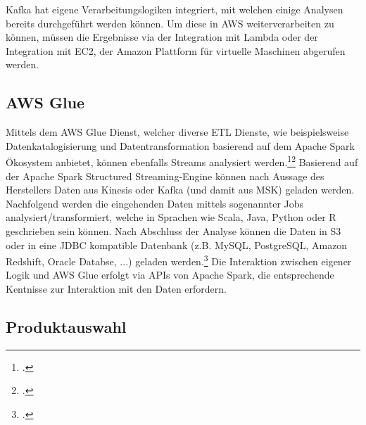 Kafka hat eigene Verarbeitungslogiken integriert, mit welchen einige Analysen bereits durchgeführt werden können. Um diese in \ac{AWS} weiterverarbeiten zu können, müssen die Ergebnisse via der Integration mit Lambda oder der Integration mit \ac{EC2}, der Amazon Plattform für virtuelle Maschinen abgerufen werden.


\subsection{AWS Glue}
Mittels dem \ac{AWS} Glue Dienst, welcher diverse \ac{ETL} Dienste, wie beispielsweise Datenkatalogisierung und Datentransformation basierend auf dem Apache Spark Ökosystem anbietet, können ebenfalls Streams analysiert werden.\footcite[Vgl.][]{AmazonWebServicesInc..o.J.d}\nzitat\footcite[Vgl. auch im Folgenden][]{AmazonWebServicesInc..2020} Basierend auf der Apache Spark Structured 
Streaming-Engine können nach Aussage des Herstellers Daten aus Kinesis oder Kafka (und damit aus \ac{MSK}) geladen werden. Nachfolgend werden die eingehenden Daten mittels sogenannter Jobs analysiert/transformiert, welche in Sprachen wie Scala, Java, Python oder R geschrieben sein können. Nach Abschluss der Analyse können die Daten in \ac{S3} oder in eine \ac{JDBC} kompatible Datenbank (z.B. MySQL, PostgreSQL, Amazon Redshift, Oracle Databse, ...) geladen werden.\footcite[Vgl.][]{AmazonWebServicesInc..o.J.e} Die Interaktion zwischen eigener Logik und AWS Glue erfolgt via \acp{API} von Apache Spark, die entsprechende Kentnisse zur Interaktion mit den Daten erfordern.

\subsection{Produktauswahl}